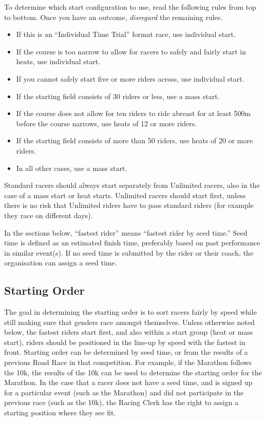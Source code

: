 To determine which start configuration to use, read the following rules from top to bottom.
Once you have an outcome, \textit{disregard} the remaining rules.
\begin{itemize}
\item If this is an ``Individual Time Trial'' format race, use individual start.
\item If the course is too narrow to allow for racers to safely and fairly start in heats, use individual start.
\item If you cannot safely start five or more riders across, use individual start.
\item If the starting field consists of 30 riders or less, use a mass start.
\item If the course does not allow for ten riders to ride abreast for at least 500m before the course narrows, use heats of 12 or more riders.
\item If the starting field consists of more than 50 riders, use heats of 20 or more riders.
\item In all other cases, use a mass start.
\end{itemize}
Standard racers should always start separately from Unlimited racers, also in the case of a mass start or heat starts.
Unlimited racers should start first, unless there is no risk that Unlimited riders have to pass standard riders (for example they race on different days).

In the sections below, ``fastest rider'' means ``fastest rider by seed time.'' Seed time is defined as an estimated finish time, preferably based on past performance in similar event(s).
If no seed time is submitted by the rider or their coach, the organisation can assign a seed time.

\subsection{Starting Order}
The goal in determining the starting order is to sort racers fairly by speed while still making sure that genders race amongst themselves.
Unless otherwise noted below, the fastest riders start first, and also within a start group (heat or mass start), riders should be positioned in the line-up by speed with the fastest in front.
Starting order can be determined by seed time, or from the results of a previous Road Race in that competition.
For example, if the Marathon follows the 10k, the results of the 10k can be used to determine the starting order for the Marathon.
In the case that a racer does not have a seed time, and is signed up for a particular event (such as the Marathon) and did not participate in the previous race (such as the 10k), the Racing Clerk has the right to assign a starting position where they see fit.

